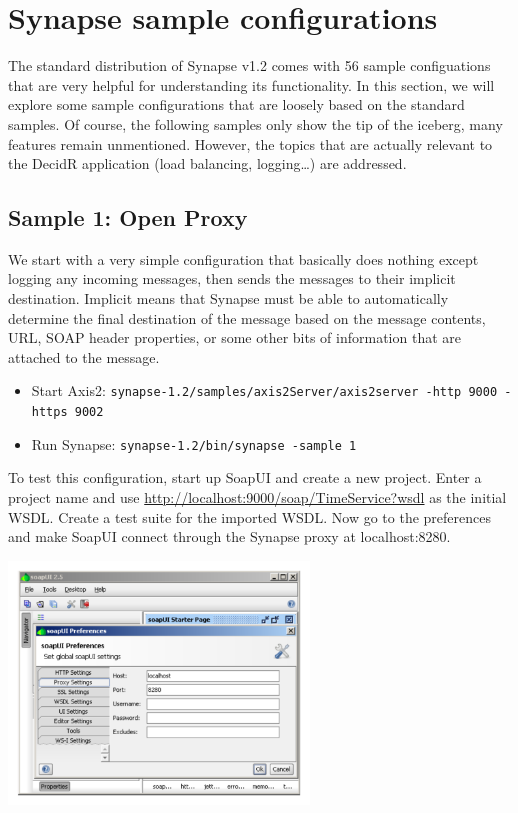 \section{Synapse sample configurations}
\label{chap:synapse-sample-configurations}
\lstset{frame=single,
	    basicstyle=\tiny,
	    numbers=left,                   
		numberstyle=\tiny, 
	    commentstyle=\textit,
	    breaklines=true}

The standard distribution of Synapse v1.2 comes with 56 sample configuations that
are very helpful for understanding its functionality. In this section, we will
explore some sample configurations that are loosely based on the standard
samples. Of course, the following samples only show the tip of the iceberg, many
features remain unmentioned. However, the topics that are actually relevant to
the DecidR application (load balancing, logging\ldots) are addressed.

\subsection{Sample 1: Open Proxy}
\label{sec:sample-1}
We start with a very simple configuration that basically does nothing except
logging any incoming messages, then sends the messages to their implicit
destination. Implicit means that Synapse must be able to automatically
determine the final destination of the message based on the message contents,
URL, SOAP header properties, or some other bits of information that are attached to
the message.
\begin{itemize}
  \item Start Axis2: \texttt{synapse-1.2/samples/axis2Server/axis2server -http
  9000 -https 9002}
  \item Run Synapse: \texttt{synapse-1.2/bin/synapse -sample 1}
\end{itemize}

\lstset{caption=, label=sample-1-xml}


To test this configuration, start up SoapUI and create a new project. Enter a
project name and use \url{http://localhost:9000/soap/TimeService?wsdl} as the
initial WSDL. Create a test suite for the imported WSDL. Now go to the
preferences and make SoapUI connect through the Synapse proxy at localhost:8280.

\begin{center}
\includegraphics[width=8cm]{figures/soapui-proxy.pdf}
\end{center}


